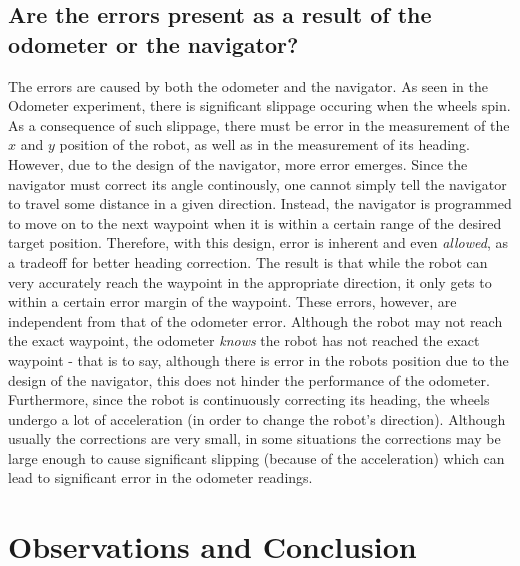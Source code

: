 \documentclass[11pt]{article}
\begin{document}
\subsection{Are the errors present as a result of the odometer or the navigator?}
The errors are caused by both the odometer and the navigator. As seen in the Odometer experiment, there
is significant slippage occuring when the wheels spin. As a consequence of such slippage, there must
be error in the measurement of the $x$ and $y$ position of the robot, as well as in the measurement
of its heading. \\
However, due to the design of the navigator, more error emerges. Since the navigator
must correct its angle continously, one cannot simply tell the navigator to travel some distance in
a given direction. Instead, the navigator is programmed to move on to the next waypoint when it is
within a certain range of the desired target position. Therefore, with this design, error is
inherent and even \textit{allowed}, as a tradeoff for better heading correction. The result is that
while the robot can very accurately reach the waypoint in the appropriate direction, it only gets
to within a certain error margin of the waypoint. These errors, however, are independent from that of
the odometer error. Although the robot may not reach the exact waypoint, the odometer \textit{knows}
the robot has not reached the exact waypoint - that is to say, although there is error in the robots
position due to the design of the navigator, this does not hinder the performance of the odometer.
\\
Furthermore, since the robot is continuously correcting its heading, the wheels undergo a lot of
acceleration (in order to change the robot's direction). Although usually the corrections are very
small, in some situations the corrections may be large enough to cause significant slipping (because
of the acceleration) which can lead to significant error in the odometer readings.

\section{Observations and Conclusion}
\end{document}
